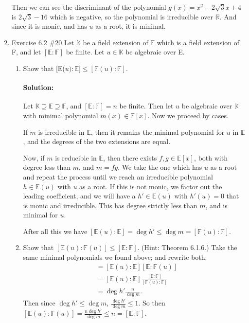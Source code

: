 \documentclass{article}
\begin{document}
\begin{enumerate}
Then we can see the discriminant of the polynomial $g(x)=x^2-2\sqrt{3} x+4$ is $2\sqrt{3} -16$ which is negative,
so the polynomial is irreducible over $\mathbb{R}$. And since it is monic, and has $u$ as a root, it is minimal.
\newpage

\item Exercise 6.2 \#20 Let $\mathbb{K}$ be a field extension of $\mathbb{E}$ which is a field extension of F,
    and let $[\mathbb{E}:\mathbb{F}]$ be finite. Let $u\in\mathbb{K}$ be algebraic over E.
\begin{enumerate}              
    \item Show that [E($u):\mathbb{E}]\leq[\mathbb{F}(u):\mathbb{F}].$
        \paragraph{Solution:} Let $\mathbb{K}\supseteq \mathbb{E}\supseteq \mathbb{F}$, and $[\mathbb{E}:\mathbb{F}]=n$ be finite. Then let $u$ be algebraic over $\mathbb{K}$ with 
        minimal polynomial $m(x)\in \mathbb{F}[x]$. Now we proceed by cases.

        If $m$ is irreducible in $\mathbb{E}$, then
        it remains the minimal polynomial for $u$ in $\mathbb{E}$, and the degrees of the two extensions are equal.

        Now, if $m$ is reducible in $\mathbb{E}$, then there exists $f,g\in \mathbb{E}[x]$, both with degree less than $m$,
        and $m=fg$. We take the one which has $u$ as a root and repeat the process until we reach an irreducible polynomial 
        $h\in  \mathbb{E}(u)$ with $u$ as a root.
        If this is not monic, we factor out the leading coefficient, and we will have a $h'\in \mathbb{E}(u)$ with 
        $h'(u)=0$ that is monic and irreducible. This has degree
        strictly less than $m$, and is minimal for $u$.

        After all this we have $[\mathbb{E}(u):\mathbb{E}]=\deg  h' \leq\deg m=[\mathbb{F}(u):\mathbb{F}]$.

    \item Show that $[\mathbb{E}(u):\mathbb{F}(u)]\leq[\mathbb{E}:\mathbb{F}].$ (Hint: Theorem 6.1.6.)
        Take the same minimal polynomials we found above; and rewrite both:
        \begin{align*}
            [\mathbb{E}(u):\mathbb{F}(u)]&=[\mathbb{E}(u):\mathbb{E}][\mathbb{E}:\mathbb{F}(u)]\\
                                         &=[\mathbb{E}(u):\mathbb{E}]\frac{[\mathbb{E}:\mathbb{F}]}{[\mathbb{F}(u):\mathbb{F}]}\\
                                         &= \deg h' \frac{n}{\deg m} 
        .\end{align*}
        Then since $\deg h' \leq \deg m$, $\frac{\deg h'}{\deg m}\leq 1$. So then $[\mathbb{E}(u):\mathbb{F}(u)]=\frac{n\deg h'}{\deg m}\leq n=[\mathbb{E}:\mathbb{F}].$
\end{enumerate}


\end{enumerate}
\end{document}
